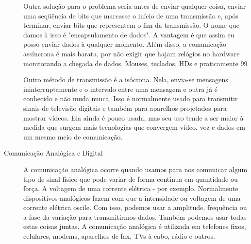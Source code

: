 \begin{description}
		Outra solução para o problema seria antes de enviar qualquer coisa, enviar uma seqüência de bits que marcasse o início de uma transmissão e, após terminar, enviar bits que representem o fim da transmissão. O nome que damos à isso é "encapsulamento de dados". A vantagem é que assim eu posso enviar dados à qualquer momento. Além disso, a comunicação assíncrona é mais barata, por não exigir que hajam relógios no hardware monitorando a chegada de dados. Mouses, teclados, HDs e praticamente 99%
		
		Outro método de transmissão é a isócrona. Nela, envia-se mensagens ininterruptamente e o intervalo entre uma mensagem e outra já é conhecido e não muda nunca. Isso é normalmente usado para transmitir sinais de televisão digitais e também para aparelhos projetados para mostrar vídeos. Ela ainda é pouco usada, mas seu uso tende a ser maior à medida que surgem mais tecnologias que convergem vídeo, voz e dados em um mesmo meio de comunicação.
		
		\item[Comunicação Analógica e Digital] A comunicação analógica ocorre quando usamos para nos comunicar algum tipo de sinal físico que pode variar de forma contínua em quantidade ou força. A voltagem de uma corrente elétrica - por exemplo. Normalmente dispositivos analógicos fazem com que a intensidade ou voltagem de uma corrente elétrica oscile. Com isso, podemos usar a amplitude, frequência ou a fase da variação para transmitirmos dados. Também podemos usar todas estas coisas juntas. A comunicação analógica é utilizada em telefones fixos, celulares, modems, aparelhos de fax, TVs à cabo, rádio e outros.
	\end{description}
	














